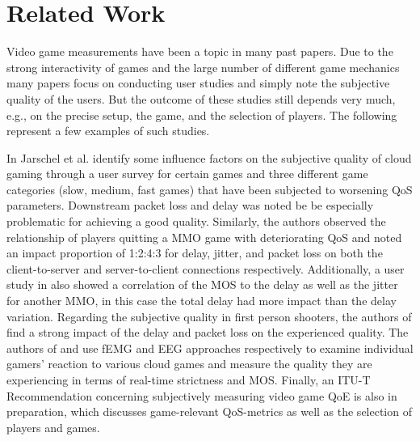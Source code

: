 \section{Related Work}
\label{sec:relatedwork}


Video game measurements have been a topic in many past papers. Due to the strong interactivity of games and the large number of different game mechanics many papers focus on conducting user studies and simply note the subjective quality of the users. But the outcome of these studies still depends very much, e.g., on the precise setup, the game, and the selection of players. The following represent a few examples of such studies. 

In \cite{5976180} Jarschel et al. identify some influence factors on the subjective quality of cloud gaming through a user survey for certain games and three different game categories (slow, medium, fast games) that have been subjected to worsening \gls{QoS} parameters. Downstream packet loss and delay was noted be be especially problematic for achieving a good quality. Similarly, the authors \cite{4591393} observed the relationship of players quitting a \gls{MMO} game with deteriorating \gls{QoS} and noted an impact proportion of 1:2:4:3 for delay, jitter, and packet loss on both the client-to-server and server-to-client connections respectively. Additionally, a user study in \cite{4604397} also showed a correlation of the \gls{MOS} to the delay as well as the jitter for another \gls{MMO}, in this case the total delay had more impact than the delay variation. Regarding the subjective quality in first person shooters, the authors of \cite{6614351} find a strong impact of the delay and packet loss on the experienced quality. The authors of \cite{6404025} and \cite{beyerusing} use \gls{fEMG} and \gls{EEG} approaches respectively to examine individual gamers' reaction to various cloud games and measure the quality they are experiencing in terms of real-time strictness and \gls{MOS}. Finally, an ITU-T Recommendation \cite{mollertowards} concerning subjectively measuring video game \gls{QoE} is also in preparation, which discusses game-relevant \gls{QoS}-metrics as well as the selection of players and games.

